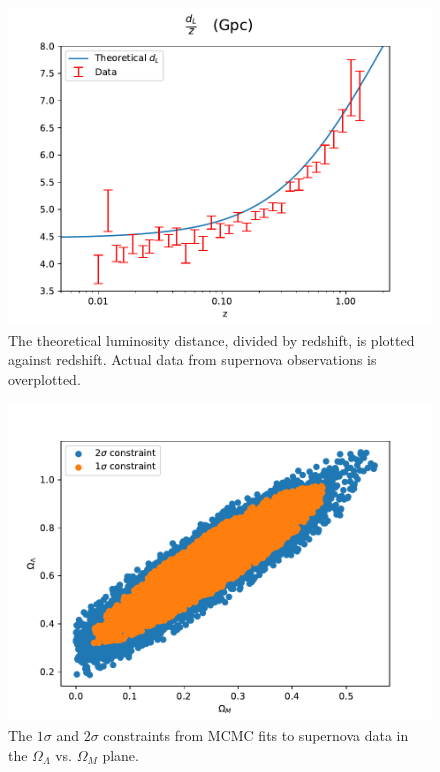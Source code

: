 \documentclass{aa}
\begin{document}
\begin{figure}[H]
   \includegraphics[scale=0.6]{../figures/milestone1/dataplot.pdf}
   \caption{The theoretical luminosity distance, divided by redshift, is plotted against redshift. Actual data from supernova observations is overplotted.}\label{fig:M1_data}
\end{figure}

\begin{figure}[H]
   \includegraphics[scale=0.6]{../figures/milestone1/constraints.pdf}
   \caption{The $1\sigma$ and $2\sigma$ constraints from MCMC fits to supernova data in the $\Omega_\Lambda$ vs. $\Omega_M$ plane.}\label{fig:M1_constraints}
\end{figure}
\end{document}

